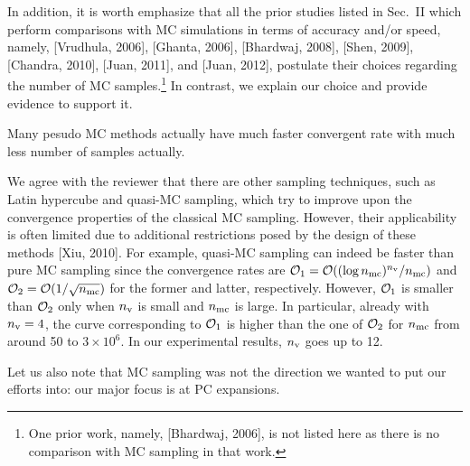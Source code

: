 \begin{authors}
In addition, it is worth emphasize that all the prior studies listed in Sec.~II which perform comparisons with MC simulations in terms of accuracy and/or speed, namely, [Vrudhula, 2006], [Ghanta, 2006], [Bhardwaj, 2008], [Shen, 2009], [Chandra, 2010], [Juan, 2011], and [Juan, 2012], postulate their choices regarding the number of MC samples.\footnote{One prior work, namely, [Bhardwaj, 2006], is not listed here as there is no comparison with MC sampling in that work.}
In contrast, we explain our choice and provide evidence to support it.

\begin{actions}
\end{actions}
\end{authors}

\begin{reviewer}
Many pesudo MC methods actually have much faster convergent rate with much less number of samples actually.
\end{reviewer}
\begin{authors}
We agree with the reviewer that there are other sampling techniques, such as Latin hypercube and quasi-MC sampling, which try to improve upon the convergence properties of the classical MC sampling.
However, their applicability is often limited due to additional restrictions posed by the design of these methods [Xiu, 2010].
For example, quasi-MC sampling can indeed be faster than pure MC sampling since the convergence rates are $\mathcal{O}_1 = \mathcal{O}((\log{n_\text{mc}})^{n_\text{v}} / {n_\text{mc}})$ and $\mathcal{O}_2 = \mathcal{O}(1 / \sqrt{{n_\text{mc}}})$ for the former and latter, respectively.
However, $\mathcal{O}_1$ is smaller than $\mathcal{O}_2$ only when ${n_\text{v}}$ is small and ${n_\text{mc}}$ is large.
In particular, already with ${n_\text{v}} = 4$, the curve corresponding to $\mathcal{O}_1$ is higher than the one of $\mathcal{O}_2$ for ${n_\text{mc}}$ from around 50 to $3 \times 10^6$.
In our experimental results, ${n_\text{v}}$ goes up to 12.

Let us also note that MC sampling was not the direction we wanted to put our efforts into: our major focus is at PC expansions.

\begin{actions}
\end{actions}
\end{authors}

